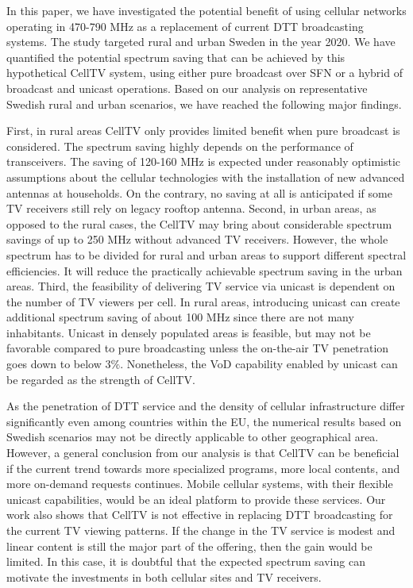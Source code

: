 \documentclass[journal]{IEEEtran}
\begin{document}
In this paper, we have investigated the potential benefit of using cellular networks operating in 470-790 MHz as a replacement of current DTT broadcasting systems. The study targeted rural and urban Sweden in the year 2020. We have quantified the potential spectrum saving that can be achieved by this hypothetical CellTV system, using either pure broadcast over SFN or a hybrid of broadcast and unicast operations. Based on our analysis on representative Swedish rural and urban scenarios, we have reached the following major findings.

First, in rural areas CellTV only provides limited benefit when pure broadcast is considered. The spectrum saving highly depends on the performance of transceivers. The saving of 120-160 MHz is expected under reasonably optimistic assumptions about the cellular technologies with the installation of new advanced antennas at households. On the contrary, no saving at all is anticipated if some TV receivers still rely on legacy rooftop antenna. Second, in urban areas, as opposed to the rural cases, the CellTV may bring about considerable spectrum savings of up to 250 MHz without advanced TV receivers. However, the whole spectrum has to be divided for rural and urban areas to support different spectral efficiencies. It will reduce the practically achievable spectrum saving in the urban areas. Third, the feasibility of delivering TV service via unicast is dependent on the number of TV viewers per cell. In rural areas, introducing unicast can create additional spectrum saving of about 100 MHz since there are not many inhabitants. Unicast in densely populated areas is feasible, but may not be favorable compared to pure broadcasting unless the on-the-air TV penetration goes down to below $3\%$. Nonetheless, the VoD capability enabled by unicast can be regarded as the strength of CellTV.

As the penetration of DTT service and the density of cellular infrastructure differ significantly even among countries within the EU, the numerical results based on Swedish scenarios may not be directly applicable to other geographical area. However, a general conclusion from our analysis is that CellTV can be beneficial if the current trend towards more specialized programs, more local contents, and more on-demand requests continues. Mobile cellular systems, with their flexible unicast capabilities, would be an ideal platform to provide these services. Our work also shows that CellTV is not effective in replacing DTT broadcasting for the current TV viewing patterns. If the change in the TV service is modest and linear content is still the major part of the offering, then the gain would be limited. In this case, it is doubtful that the expected spectrum saving can motivate the investments in both cellular sites and TV receivers.
\end{document}
